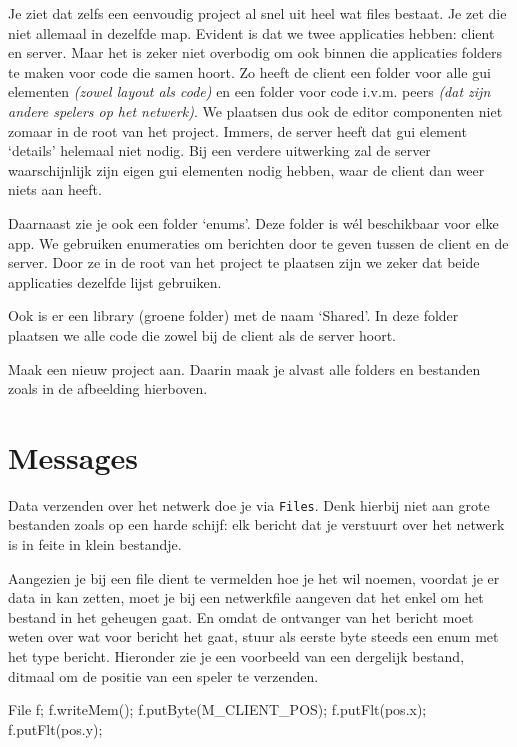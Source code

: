 Je ziet dat zelfs een eenvoudig project al snel uit heel wat files bestaat. Je zet die niet allemaal in dezelfde map. Evident is dat we twee applicaties hebben: client en server. Maar het is zeker niet overbodig om ook binnen die applicaties folders te maken voor code die samen hoort. Zo heeft de client een folder voor alle gui elementen \textit{(zowel layout als code)} en een folder voor code i.v.m. peers \textit{(dat zijn andere spelers op het netwerk)}. We plaatsen dus ook de editor componenten niet zomaar in de root van het project. Immers, de server heeft dat gui element `details' helemaal niet nodig. Bij een verdere uitwerking zal de server waarschijnlijk zijn eigen gui elementen nodig hebben, waar de client dan weer niets aan heeft.

Daarnaast zie je ook een folder `enums'. Deze folder is w\'el beschikbaar voor elke app. We gebruiken enumeraties om berichten door te geven tussen de client en de server. Door ze in de root van het project te plaatsen zijn we zeker dat beide applicaties dezelfde lijst gebruiken.

Ook is er een library (groene folder) met de naam `Shared'. In deze folder plaatsen we alle code die zowel bij de client als de server hoort.

\begin{exercise}
Maak een nieuw project aan. Daarin maak je alvast alle folders en bestanden zoals in de afbeelding hierboven.
\end{exercise}

\section{Messages}
Data verzenden over het netwerk doe je via \texttt{Files}. Denk hierbij niet aan grote bestanden zoals op een harde schijf: elk bericht dat je verstuurt over het netwerk is in feite in klein bestandje. 

Aangezien je bij een file dient te vermelden hoe je het wil noemen, voordat je er data in kan zetten, moet je bij een netwerkfile aangeven dat het enkel om het bestand in het geheugen gaat. En omdat de ontvanger van het bericht moet weten over wat voor bericht het gaat, stuur als eerste byte steeds een enum met het type bericht. Hieronder zie je een voorbeeld van een dergelijk bestand, ditmaal om de positie van een speler te verzenden.

\begin{code}
File f;
f.writeMem();
f.putByte(M_CLIENT_POS);
f.putFlt(pos.x);
f.putFlt(pos.y);
\end{code}

